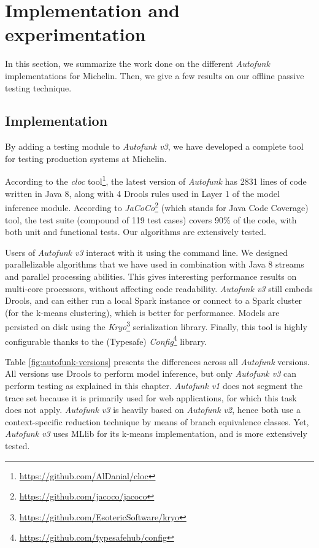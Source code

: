 \section{Implementation and experimentation}
\label{sec:testing:offline:impl-exp}

In this section, we summarize the work done on the different
\emph{Autofunk} implementations for Michelin. Then, we give a few
results on our offline passive testing technique.

\subsection{Implementation}

By adding a testing module to \emph{Autofunk v3}, we have
developed a complete tool for testing production systems at
Michelin.

According to the \emph{cloc}
tool\footnote{\url{https://github.com/AlDanial/cloc}}, the latest
version of \emph{Autofunk} has 2831 lines of code written in Java
8, along with 4 Drools rules used in Layer 1 of the model
inference module.  According to
\emph{JaCoCo}\footnote{\url{https://github.com/jacoco/jacoco}}
(which stands for Java Code Coverage) tool, the test suite
(compound of 119 test cases) covers 90\% of the code, with both
unit and functional tests. Our algorithms are extensively tested.

Users of \emph{Autofunk v3} interact with it using the command
line. We designed parallelizable algorithms that we have used in
combination with Java 8 streams and parallel processing
abilities. This gives interesting performance results on
multi-core processors, without affecting code readability.
\emph{Autofunk v3} still embeds Drools, and can either run a
local Spark instance or connect to a Spark cluster (for the
k-means clustering), which is better for performance.  Models are
persisted on disk using the
\emph{Kryo}\footnote{\url{https://github.com/EsotericSoftware/kryo}}
serialization library. Finally, this tool is highly configurable
thanks to the (Typesafe)
\emph{Config}\footnote{\url{https://github.com/typesafehub/config}}
library.

Table \ref{fig:autofunk-versions} presents the differences
across all \emph{Autofunk} versions. All versions use Drools to
perform model inference, but only \emph{Autofunk v3} can perform
testing as explained in this chapter. \emph{Autofunk v1} does not
segment the trace set because it is primarily used for web
applications, for which this task does not apply. \emph{Autofunk
v3} is heavily based on \emph{Autofunk v2}, hence both use a
context-specific reduction technique by means of branch
equivalence classes. Yet, \emph{Autofunk v3} uses MLlib for its
k-means implementation, and is more extensively tested.

